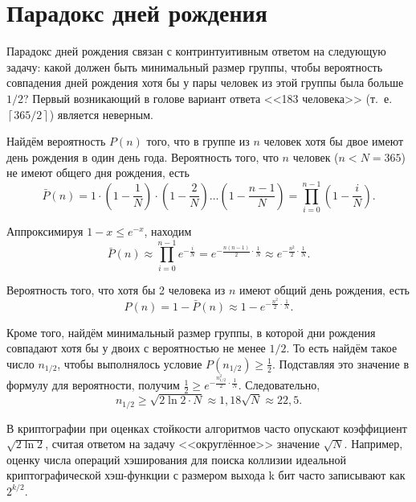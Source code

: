 \section{Парадокс дней рождения}\label{section-birthday-padradox}

Парадокс дней рождения связан с контринтуитивным ответом на следующую задачу: какой должен быть минимальный размер группы, чтобы вероятность совпадения дней рождения хотя бы у пары человек из этой группы была больше $1 / 2$? Первый возникающий в голове вариант ответа <<183 человека>> (т.~е. $\left\lceil 365 / 2 \right\rceil$) является неверным.

Найдём вероятность $P(n)$ того, что в группе из $n$ человек хотя бы двое имеют день рождения в один день года. Вероятность того, что $n$ человек ($n < N = 365$) не имеют общего дня рождения, есть
\[
    \bar{P}(n) = 1 \cdot \left( 1 - \frac{1}{N} \right) \cdot \left(1 - \frac{2}{N} \right)  \dots  \left( 1 - \frac{n-1}{N} \right) = \prod\limits_{i=0}^{n-1} \left( 1 - \frac{i}{N} \right).
\]

Аппроксимируя $1-x \leq e^{-x}$, находим
    \[ \bar{P}(n) \approx \prod\limits_{i=0}^{n-1} e^{-\frac{i}{N}} = e^{-\frac{n(n-1)}{2} \cdot \frac{1}{N}} \approx e^{-\frac{n^2}{2} \cdot \frac{1}{N}}. \]

Вероятность того, что хотя бы 2 человека из $n$ имеют общий день рождения, есть
    \[ P(n) = 1 - \bar{P}(n) \approx 1 -  e^{-\frac{n^2}{2} \cdot \frac{1}{N}}. \]

Кроме того, найдём минимальный размер группы, в которой дни рождения совпадают хотя бы у двоих с вероятностью не менее $1 / 2$. То есть найдём такое число $n_{1/2}$, чтобы выполнялось условие $P(n_{1/2}) \geq \frac{1}{2}$. Подставляя это значение в формулу для вероятности, получим $\frac{1}{2} \geq e^{-\frac{n_{1/2}^2}{2} \cdot \frac{1}{N}}$. Следовательно,
	\[n_{1/2} \geq \sqrt{2 \ln 2 \cdot N} \approx 1,18 \sqrt{ N } \approx 22,5.\]

В криптографии при оценках стойкости алгоритмов часто опускают коэффициент $\sqrt{2 \ln 2}$, считая ответом на задачу <<округлённое>> значение $\sqrt{ N }$. Например, оценку числа операций хэширования для поиска коллизии идеальной криптографической хэш-функции с размером выхода k бит часто записывают как $2^{k/2}$.
